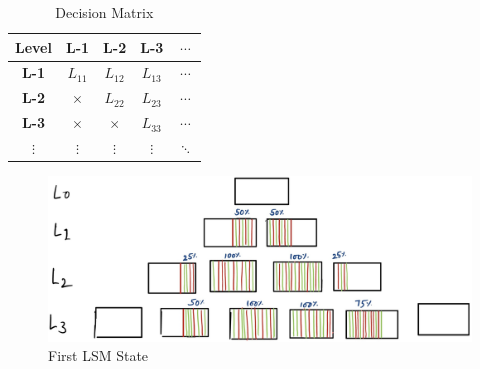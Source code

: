 
\begin{table}
    \caption{Decision Making Data}
    \label{table:decision-making-meta-data}
\end{table}

\begin{table}
    \begin{tabular}{ |c|c|c|c|c| }
        \hline
        \textbf{Level} & \textbf{L-1} & \textbf{L-2} & \textbf{L-3} & $\cdots$ \\
        \hline
        \textbf{L-1} & $L_{11}$ & $L_{12}$ & $L_{13}$ & $\cdots$ \\
        \hline
        \textbf{L-2} & $\times$ & $L_{22}$ & $L_{23}$ & $\cdots$ \\
        \hline
        \textbf{L-3} &  $\times$ &  $\times$ & $L_{33}$ & $\cdots$ \\
        \hline
        $\vdots$ &  $\vdots$ &  $\vdots$ & $\vdots$ & $\ddots$ \\
        \hline
    \end{tabular}
    \caption{Decision Matrix }
    \label{table:decision-matrix}
\end{table}

\begin{figure}
    \includegraphics[scale=0.08]{Figures/first-state-lsm.jpg}
    \caption{First LSM State}\label{fig:first-state-lsm}
\end{figure}

